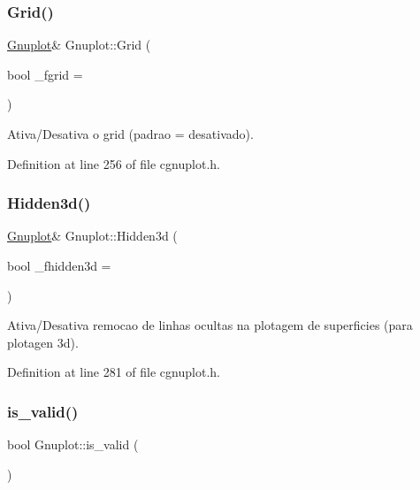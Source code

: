 \mbox{\label{class_gnuplot_a67e669cdac3b09ae16678f5211dda786}} 
\subsubsection{\texorpdfstring{Grid()}{Grid()}}
{\footnotesize\ttfamily \hyperlink{class_gnuplot}{Gnuplot}\& Gnuplot\+::\+Grid (\begin{DoxyParamCaption}\item[{bool}]{\+\_\+fgrid = {} }\end{DoxyParamCaption})\hspace{0.3cm}{\ttfamily [inline]}}



Ativa/\+Desativa o grid (padrao = desativado). 



Definition at line 256 of file cgnuplot.\+h.

\mbox{\label{class_gnuplot_a9004d7b6d322be1eeb32eb8eb0c25487}} 
\subsubsection{\texorpdfstring{Hidden3d()}{Hidden3d()}}
{\footnotesize\ttfamily \hyperlink{class_gnuplot}{Gnuplot}\& Gnuplot\+::\+Hidden3d (\begin{DoxyParamCaption}\item[{bool}]{\+\_\+fhidden3d = {} }\end{DoxyParamCaption})\hspace{0.3cm}{\ttfamily [inline]}}



Ativa/\+Desativa remocao de linhas ocultas na plotagem de superficies (para plotagen 3d). 



Definition at line 281 of file cgnuplot.\+h.

\mbox{\label{class_gnuplot_a3135ffebb308b50c4f3178a62b23ab03}} 
\subsubsection{\texorpdfstring{is\+\_\+valid()}{is\_valid()}}
{\footnotesize\ttfamily bool Gnuplot\+::is\+\_\+valid (\begin{DoxyParamCaption}{ }\end{DoxyParamCaption})}



